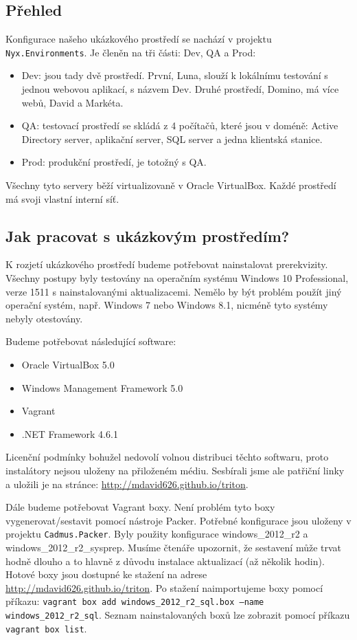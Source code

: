 \subsection{Přehled}
Konfigurace našeho ukázkového prostředí se nachází v projektu \texttt{Nyx.Environments}. Je členěn na tři části: Dev, QA a Prod:
\begin{itemize}
\item Dev: jsou tady dvě prostředí. První, Luna, slouží k lokálnímu testování s jednou webovou aplikací, s názvem Dev. Druhé prostředí, Domino, má více webů, David a Markéta. 
\item QA: testovací prostředí se skládá z 4 počítačů, které jsou v doméně: Active Directory server, aplikační server, SQL server a jedna klientská stanice. 
\item Prod: produkční prostředí, je totožný s QA.
\end{itemize} 

Všechny tyto servery běží virtualizovaně v Oracle VirtualBox. Každé prostředí má svoji vlastní interní síť. 

\subsection{Jak pracovat s ukázkovým prostředím?}
K rozjetí ukázkového prostředí budeme potřebovat nainstalovat prerekvizity. Všechny postupy byly testovány na operačním systému Windows 10 Professional, verze 1511 s nainstalovanými aktualizacemi. Nemělo by být problém použít jiný operační systém, např. Windows 7 nebo Windows 8.1, nicméně tyto systémy nebyly otestovány.

Budeme potřebovat následující software:
\begin{itemize}
\item Oracle VirtualBox 5.0
\item Windows Management Framework 5.0
\item Vagrant
\item .NET Framework 4.6.1
\end{itemize}

Licenční podmínky bohužel nedovolí volnou distribuci těchto softwaru, proto instalátory nejsou uloženy na přiloženém médiu. Sesbírali jsme ale patřiční linky a uložili je na stránce: \url{http://mdavid626.github.io/triton}.

Dále budeme potřebovat Vagrant boxy. Není problém tyto boxy vygenerovat/sestavit pomocí nástroje Packer. Potřebné konfigurace jsou uloženy v projektu \texttt{Cadmus.Packer}. Byly použity konfigurace windows\_2012\_r2 a windows\_2012\_r2\_sysprep. Musíme čtenáře upozornit, že sestavení může trvat hodně dlouho a to hlavně z důvodu instalace aktualizací (až několik hodin). Hotové boxy jsou dostupné ke stažení na adrese \url{http://mdavid626.github.io/triton}. Po stažení naimportujeme boxy pomocí příkazu: \texttt{vagrant box add windows\_2012\_r2\_sql.box --name windows\_2012\_r2\_sql}. Seznam nainstalovaných boxů lze zobrazit pomocí příkazu \texttt{vagrant box list}.

